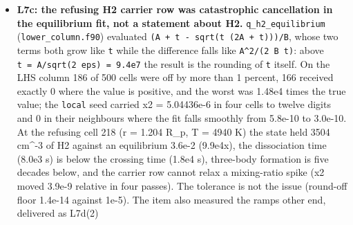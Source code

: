 \documentclass[english,a4paper]{my_memo}
\begin{document}
\begin{itemize}
  reservoir in a cell is reported and does not gate -\/- the element rows\textquotesingle{} own
  rule, now a named constant: the gate moves from a cell with \texttt{n(H2)} exactly
  zero to cell 218, where H2 is real at 2.5e-6 of n\_H, and still refuses at
  0.995, so an absent species no longer blocks but the molecular solution is
  not yet certified; \texttt{carrier\_model\_a\_newton} rows identical before and
  after. (The x\_H2 pin of \texttt{ionization\_equilibrium} under transport is design,
  not a defect.) (2) One energy bracket ceiling for every cell, with the
  validity statement at the code site: the He-poor cold march that stopped at
  step 983 at 7.07e4 K now runs 1200 steps with a maximum of 3.94e4 K, and a
  probe with only this change reverted stops again at step 982. (3) The base
  ghost\textquotesingle s H2 row is imposed as \texttt{x2\ (1\ -\ x\_ion)}, the partition of the
  non-ionized hydrogen, with an infeasible prescription refused by cell,
  demand and room: the march that stopped at step 1240 with
  \texttt{x(1)\ +\ x(4)\ =\ 1.000307} runs 3000 steps with \texttt{x(4)/(1\ -\ x\_ion)\ =\ x2} to
  eight digits. Movement on the seven \texttt{mol\_*} regression cases, single thread,
  control against measured with only these five files differing: 3e-6 to
  2.7e-4, all within 1e-3.
\item
  \textbf{L7c: the refusing H2 carrier row was catastrophic cancellation in the
  equilibrium fit, not a statement about H2.} \texttt{q\_h2\_equilibrium}
  (\texttt{lower\_column.f90}) evaluated \texttt{(A\ +\ t\ -\ sqrt(t\ (2A\ +\ t)))/B}, whose two
  terms both grow like \texttt{t} while the difference falls like \texttt{A\^{}2/(2\ B\ t)}:
  above \texttt{t\ =\ A/sqrt(2\ eps)\ =\ 9.4e7} the result is the rounding of \texttt{t} itself.
  On the LHS column 186 of 500 cells were off by more than 1 percent, 166
  received exactly 0 where the value is positive, and the worst was 1.48e4
  times the true value; the \texttt{local} seed carried x2 = 5.04436e-6 in four
  cells to twelve digits and 0 in their neighbours where the fit falls
  smoothly from 5.8e-10 to 3.0e-10. At the refusing cell 218 (r = 1.204 R\_p,
  T = 4940 K) the state held 3504 cm\^{}-3 of H2 against an equilibrium 3.6e-2
  (9.9e4x), the dissociation time (8.0e3 s) is below the crossing time
  (1.8e4 s), three-body formation is five decades below, and the carrier row
  cannot relax a mixing-ratio spike (x2 moved 3.9e-9 relative in four
  passes). The tolerance is not the issue (round-off floor 1.4e-14 against
  1e-5). The item also measured the ramp\textquotesingle s other end, delivered as L7d(2)

\end{itemize}
\end{document}
